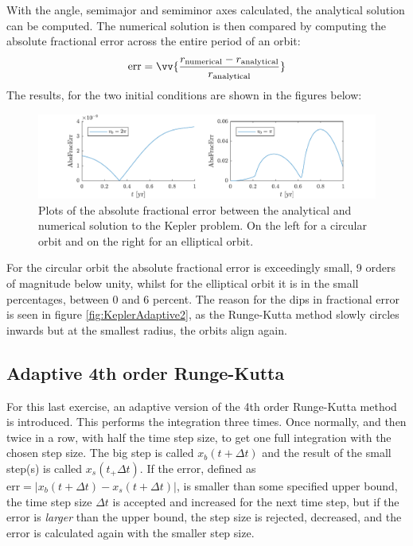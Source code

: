 \documentclass[a4paper,10pt]{article} 	%
\numberwithin{equation}{section}
\begin{document}
	With the angle, semimajor and semiminor axes calculated, the analytical solution can be computed. The numerical solution is then compared by computing the absolute fractional error across the entire period of an orbit:
	\begin{equation}
		\text{err} = \vv{\frac{r_{\text{numerical}}-r_{\text{analytical}}}{r_{\text{analytical}}}}
	\end{equation}
	The results, for the two initial conditions are shown in the figures below:
	\begin{figure}[H]
		\centering
		\includegraphics[width = \linewidth]{KeplerFracErr.pdf}
		\caption{Plots of the absolute fractional error between the analytical and numerical solution to the Kepler problem. On the left for a circular orbit and on the right for an elliptical orbit.}
		\label{fig:KeplerAnalytical}
	\end{figure}
	For the circular orbit the absolute fractional error is exceedingly small, 9 orders of magnitude below unity, whilst for the elliptical orbit it is in the small percentages, between 0 and 6 percent. The reason for the dips in fractional error is seen in figure \ref{fig:KeplerAdaptive2}, as the Runge-Kutta method slowly circles inwards but at the smallest radius, the orbits align again.

	\subsection{Adaptive 4th order Runge-Kutta}
	For this last exercise, an adaptive version of the 4th order Runge-Kutta method is introduced. This performs the integration three times. Once normally, and then twice in a row, with half the time step size, to get one full integration with the chosen step size. The big step is called $ x_b(t+\Delta t) $ and the result of the small step(s) is called $ x_s(t_+\Delta t) $. If the error, defined as $ \text{err} = |x_b(t+\Delta t)-x_s(t+\Delta t) |$, is smaller than some specified upper bound, the time step size $ \Delta t $ is accepted and increased for the next time step, but if the error is \textit{larger} than the upper bound, the step size is rejected, decreased, and the error is calculated again with the smaller step size.
	
\end{document}
